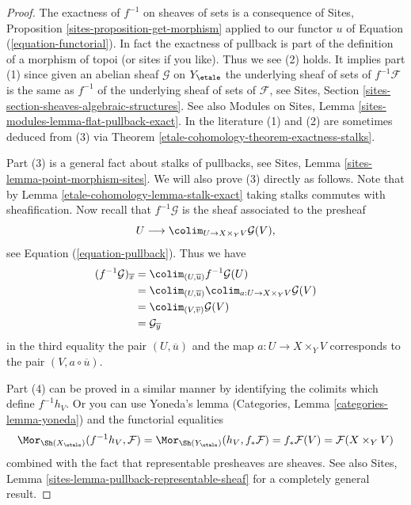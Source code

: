 \begin{proof}
The exactness of $f^{-1}$ on sheaves of sets is a consequence of
Sites, Proposition \ref{sites-proposition-get-morphism}
applied to our functor $u$ of Equation (\ref{equation-functorial}).
In fact the exactness of pullback is part of the definition of
a morphism of topoi (or sites if you like). Thus we see (2) holds.
It implies part (1) since given an abelian sheaf $\mathcal{G}$ on
$Y_\etale$
the underlying sheaf of sets of $f^{-1}\mathcal{F}$ is the same
as $f^{-1}$ of the underlying sheaf of sets of $\mathcal{F}$, see
Sites, Section \ref{sites-section-sheaves-algebraic-structures}.
See also
Modules on Sites, Lemma \ref{sites-modules-lemma-flat-pullback-exact}.
In the literature (1) and (2) are sometimes deduced from (3) via
Theorem \ref{etale-cohomology-theorem-exactness-stalks}.

\medskip\noindent
Part (3) is a general fact about stalks of pullbacks, see
Sites, Lemma \ref{sites-lemma-point-morphism-sites}.
We will also prove (3) directly as follows. Note that by
Lemma \ref{etale-cohomology-lemma-stalk-exact}
taking stalks commutes with sheafification.
Now recall that $f^{-1}\mathcal{G}$ is the sheaf
associated to the presheaf
$$
U \longrightarrow \colim_{U \to X \times_Y V} \mathcal{G}(V),
$$
see Equation (\ref{equation-pullback}).
Thus we have
\begin{align*}
(f^{-1}\mathcal{G})_{\overline{x}}
& = \colim_{(U, \overline{u})} f^{-1}\mathcal{G}(U) \\
& = \colim_{(U, \overline{u})}
\colim_{a : U \to X \times_Y V} \mathcal{G}(V) \\
& = \colim_{(V, \overline{v})} \mathcal{G}(V) \\
& = \mathcal{G}_{\overline{y}}
\end{align*}
in the third equality the pair $(U, \overline{u})$ and the map
$a : U \to X \times_Y V$ corresponds to the pair $(V, a \circ \overline{u})$.

\medskip\noindent
Part (4) can be proved in a similar manner by identifying the colimits
which define $f^{-1}h_V$. Or you can use
Yoneda's lemma (Categories, Lemma \ref{categories-lemma-yoneda})
and the functorial equalities
$$
\Mor_{\Sh(X_\etale)}(f^{-1}h_V, \mathcal{F}) =
\Mor_{\Sh(Y_\etale)}(h_V, f_*\mathcal{F}) =
f_*\mathcal{F}(V) = \mathcal{F}(X \times_Y V)
$$
combined with the fact that representable presheaves are sheaves. See also
Sites, Lemma \ref{sites-lemma-pullback-representable-sheaf}
for a completely general result.
\end{proof}

